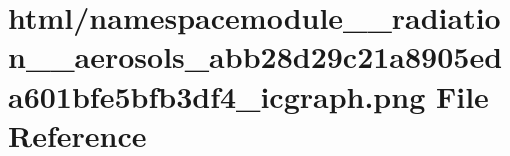 \hypertarget{namespacemodule____radiation____aerosols__abb28d29c21a8905eda601bfe5bfb3df4__icgraph_8png}{}\section{html/namespacemodule\+\_\+\+\_\+radiation\+\_\+\+\_\+aerosols\+\_\+abb28d29c21a8905eda601bfe5bfb3df4\+\_\+icgraph.png File Reference}
\label{namespacemodule____radiation____aerosols__abb28d29c21a8905eda601bfe5bfb3df4__icgraph_8png}
